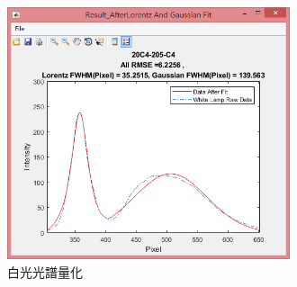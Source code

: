 \begin{figure}[H] %
	\centering %
	\vspace{0.8cm}
	\includegraphics[width=0.74\textwidth]{figures/Result/Result_2021-05-10-16-30-57.jpg} %
	\caption{白光光譜量化} %
	\label{白光光譜量化} %
\end{figure}
